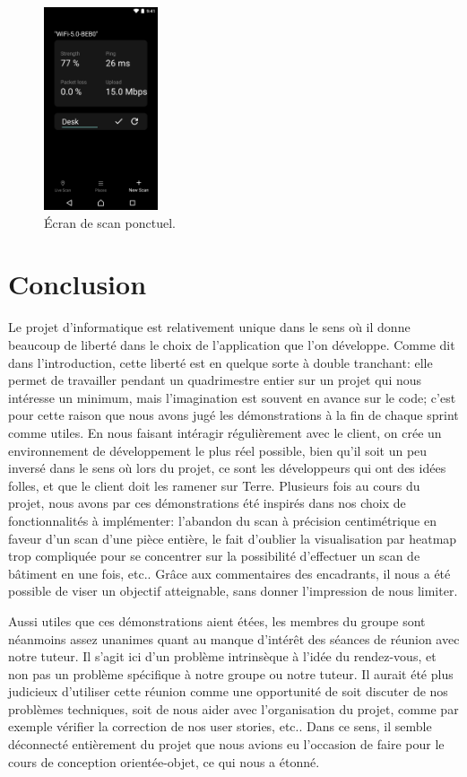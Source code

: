 \documentclass{elsarticle}
\begin{document}
\begin{figure}[!htbp]
	\centering
	\includegraphics[width=0.3\textwidth]{img/newscan}
	\caption{Écran de scan ponctuel.}
	\label{fig:newscan}
\end{figure}

\section{Conclusion}
Le projet d'informatique est relativement unique dans le sens où il donne beaucoup de liberté dans le choix de l'application que l'on développe.
Comme dit dans l'introduction, cette liberté est en quelque sorte à double tranchant: elle permet de travailler pendant un quadrimestre entier sur un projet qui nous intéresse un minimum, mais l'imagination est souvent en avance sur le code; c'est pour cette raison que nous avons jugé les démonstrations à la fin de chaque sprint comme utiles.
En nous faisant intéragir régulièrement avec le \og client\fg, on crée un environnement de développement le plus réel possible, bien qu'il soit un peu inversé dans le sens où lors du projet, ce sont les développeurs qui ont des idées folles, et que le client doit les ramener sur Terre.
Plusieurs fois au cours du projet, nous avons par ces démonstrations été inspirés dans nos choix de fonctionnalités à implémenter: l'abandon du scan à précision centimétrique en faveur d'un scan d'une pièce entière, le fait d'oublier la visualisation par heatmap trop compliquée pour se concentrer sur la possibilité d'effectuer un scan de bâtiment en une fois, etc..
Grâce aux commentaires des encadrants, il nous a été possible de viser un objectif atteignable, sans donner l'impression de nous limiter.

Aussi utiles que ces démonstrations aient étées, les membres du groupe sont néanmoins assez unanimes quant au manque d'intérêt des séances de réunion avec notre tuteur.
Il s'agit ici d'un problème intrinsèque à l'idée du rendez-vous, et non pas un problème spécifique à notre groupe ou notre tuteur.
Il aurait été plus judicieux d'utiliser cette réunion comme une opportunité de soit discuter de nos problèmes techniques, soit de nous aider avec l'organisation du projet, comme par exemple vérifier la correction de nos user stories, etc..
Dans ce sens, il semble déconnecté entièrement du projet que nous avions eu l'occasion de faire pour le cours de conception orientée-objet, ce qui nous a étonné.
\end{document}
